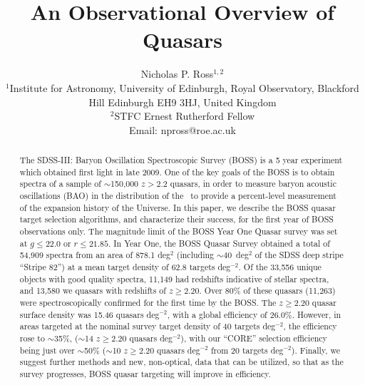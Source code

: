 \documentclass[usenatbib]{mn2e}
\begin{document}
\title[Quasar Top 100]
{An Observational Overview of Quasars}

\author[N.P. Ross]
{Nicholas P. Ross$^{1,2}$\\ %
$^1$Institute for Astronomy, University of Edinburgh, Royal Observatory, Blackford Hill 
 Edinburgh EH9 3HJ, United Kingdom\\
$^2$STFC Ernest Rutherford Fellow\\
Email: npross@roe.ac.uk\\
}

\maketitle

\begin{abstract}
The SDSS-III: Baryon Oscillation Spectroscopic Survey (BOSS) is a 5
year experiment which obtained first light in late 2009. One of the
key goals of the BOSS is to obtain spectra of a sample of
$\sim$150,000 $z>2.2$ quasars, in order to measure baryon acoustic
oscillations (BAO) in the distribution of the \lyaf\ to provide a
percent-level measurement of the expansion history of the Universe.
In this paper, we describe the BOSS quasar target selection algorithms,
and characterize their success, for the first year of BOSS observations
only.  The magnitude limit of the BOSS Year One Quasar survey was set
at $g\leq22.0$ or $r\leq21.85$.  In Year One, the BOSS Quasar Survey
obtained a total of \hbox{54,909} spectra from an area of 878.1
deg$^{2}$ (including $\sim40$~deg$^{2}$ of the SDSS deep stripe
``Stripe 82'') at a mean target density of 62.8 targets deg$^{-2}$.
Of the \hbox{33,556} unique objects with good quality spectra,
\hbox{11,149} had redshifts indicative of stellar spectra, and
\hbox{13,580} we quasars with redshifts of $z\geq2.20$. Over 80\% of
these quasars (\hbox{11,263}) were spectroscopically confirmed for the
first time by the BOSS. The $z\geq2.20$ quasar surface density was
15.46 quasars deg$^{-2}$, with a global efficiency of 26.0\%. However,
in areas targeted at the nominal survey target density of 40 targets
deg$^{-2}$, the efficiency rose to $\sim$35\%, ($\sim$14 $z\geq 2.20$
quasars deg$^{-2}$), with our ``CORE'' selection efficiency being just
over $\sim$50\% ($\sim$10 $z\geq 2.20$ quasars deg$^{-2}$ from 20
targets deg$^{-2}$). Finally, we suggest further methods and new,
non-optical, data that can be utilized, so that as the survey
progresses, BOSS quasar targeting will improve in efficiency.

\end{abstract}
\end{document}
